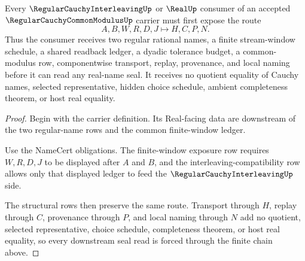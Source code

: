 \begin{theorem}
\label{thm:regular-cauchy-common-modulus-finite-window-handoff}
Every $\RegularCauchyInterleavingUp$ or $\RealUp$ consumer of an accepted $\RegularCauchyCommonModulusUp$ carrier must first expose the route
$$
A,B,W,R,D,J \longmapsto H,C,P,N .
$$
Thus the consumer receives two regular rational names, a finite stream-window schedule, a shared readback ledger, a dyadic tolerance budget, a common-modulus row, componentwise transport, replay, provenance, and local naming before it can read any real-name seal. It receives no quotient equality of Cauchy names, selected representative, hidden choice schedule, ambient completeness theorem, or host real equality.
\end{theorem}
\begin{proof}
Begin with the carrier definition. Its Real-facing data are downstream of the two regular-name rows and the common finite-window ledger.

Use the NameCert obligations. The finite-window exposure row requires $W,R,D,J$ to be displayed after $A$ and $B$, and the interleaving-compatibility row allows only that displayed ledger to feed the $\RegularCauchyInterleavingUp$ side.

The structural rows then preserve the same route. Transport through $H$, replay through $C$, provenance through $P$, and local naming through $N$ add no quotient, selected representative, choice schedule, completeness theorem, or host real equality, so every downstream seal read is forced through the finite chain above.
\end{proof}




